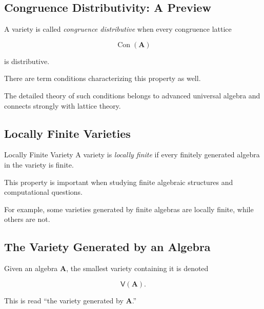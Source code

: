\subsection{Congruence Distributivity: A Preview}
\label{subsec:congruence-distributivity-preview}

A variety is called \emph{congruence distributive} when every congruence
lattice

\[ \operatorname{Con}(\mathbf A) \]

is distributive.

There are term conditions characterizing this property as well.

The detailed theory of such conditions belongs to advanced universal
algebra and connects strongly with lattice theory.

\subsection{Locally Finite Varieties}
\label{subsec:locally-finite-varieties}

\begin{definitionbox}{Locally Finite Variety}
A variety is \emph{locally finite} if every finitely generated algebra in
the variety is finite.
\end{definitionbox}

This property is important when studying finite algebraic structures and
computational questions.

For example, some varieties generated by finite algebras are locally finite,
while others are not.

\subsection{The Variety Generated by an Algebra}
\label{subsec:variety-generated-algebra}

Given an algebra \(\mathbf A\), the smallest variety containing it is
denoted

\[ \mathsf V(\mathbf A). \]

This is read ``the variety generated by \(\mathbf A\).''

